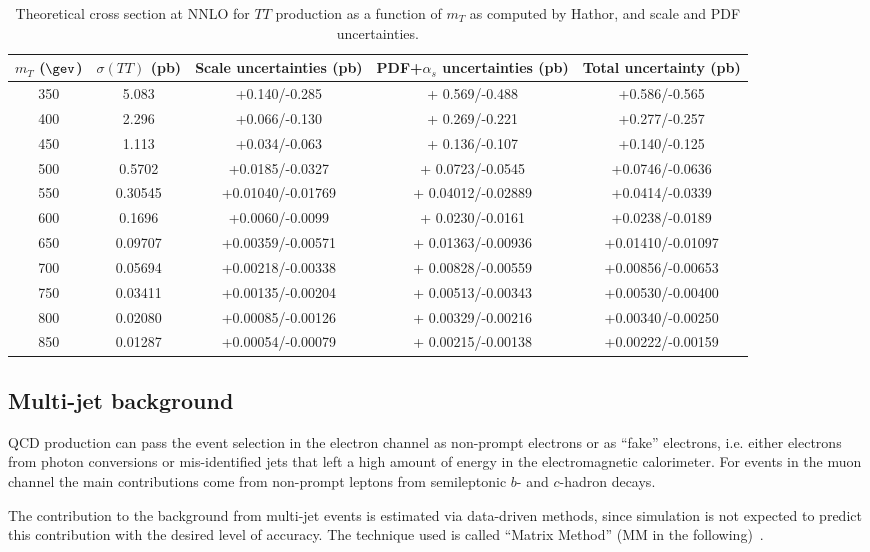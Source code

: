 \begin{table}[h!]
\begin{center}
\begin{tabular}{c c c c c}
\hline
\hline
 $m_{T}$ ($\gev$) & $\sigma(TT)$ (pb) & Scale uncertainties (pb) & PDF+$\alpha_s$ uncertainties (pb) & Total uncertainty (pb)\\
\hline
350 	&  5.083 		&  +0.140/-0.285 		&  + 0.569/-0.488 		&  +0.586/-0.565		\\
400 	&  2.296 		&  +0.066/-0.130 		&  + 0.269/-0.221 		&  +0.277/-0.257		\\
450 	&  1.113 		&  +0.034/-0.063 		&  + 0.136/-0.107 		&  +0.140/-0.125		\\
500 	&  0.5702 		&  +0.0185/-0.0327 		&  + 0.0723/-0.0545	 	&  +0.0746/-0.0636		\\
550 	&  0.30545 	&  +0.01040/-0.01769 	&  + 0.04012/-0.02889 	&  +0.0414/-0.0339		\\
600 	&  0.1696 		&  +0.0060/-0.0099 		&  + 0.0230/-0.0161	 	&  +0.0238/-0.0189		\\	
650 	&  0.09707 	&  +0.00359/-0.00571 	&  + 0.01363/-0.00936 	&  +0.01410/-0.01097	\\
700 	&  0.05694 	&  +0.00218/-0.00338 	&  + 0.00828/-0.00559 	&  +0.00856/-0.00653	\\
750 	&  0.03411 	&  +0.00135/-0.00204 	&  + 0.00513/-0.00343 	&  +0.00530/-0.00400	\\
800 	&  0.02080 	&  +0.00085/-0.00126 	&  + 0.00329/-0.00216 	&  +0.00340/-0.00250	\\
850 	&  0.01287 	&  +0.00054/-0.00079 	&  + 0.00215/-0.00138 	&  +0.00222/-0.00159 	\\
\hline
\hline
\end{tabular}
\caption{\label{tab:sigmaTT} Theoretical cross section at NNLO  for $TT$ production as a function
of $m_{T}$ as computed by {\sc Hathor}, and scale and PDF uncertainties.}
\end{center}
\end{table}

\subsection{Multi-jet background}\label{sec:qcdbkg}

QCD production can pass the event selection in the electron
channel as non-prompt electrons or as ``fake'' electrons, i.e.
either electrons from photon conversions or mis-identified jets
that left a high amount of energy in the electromagnetic calorimeter.
For events in the muon channel the main contributions come from
non-prompt leptons from semileptonic $b$- and $c$-hadron decays.


The contribution to the background from multi-jet events is
estimated via data-driven methods, since
simulation is not expected to predict this contribution
with the desired level of accuracy.
The technique used is called ``Matrix Method'' (MM in the following)~\cite{ttbar_3pb}.  




